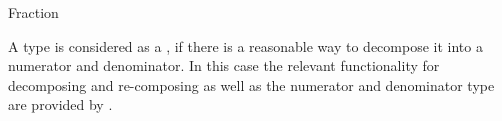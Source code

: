 \begin{ccRefConcept}{Fraction}

\ccDefinition

A type is considered as a , if there is a reasonable way to 
decompose it into a numerator and denominator. In this case the relevant 
functionality for decomposing and re-composing as well as the numerator and 
denominator type are provided by .
  
\ccSeeAlso
{}\\
\\
\\

\end{ccRefConcept}